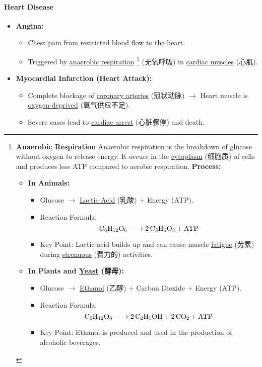 \paragraph{Heart Disease}
\begin{itemize}
    \item \textbf{Angina:}
    \begin{itemize}
        \item Chest pain from restricted blood flow to the heart.
        \item Triggered by \underline{anaerobic respiration} \footnote{\textbf{Anaerobic Respiration} Anaerobic respiration is the
        breakdown of glucose without oxygen to release energy. It occurs in the \underline{cytoplasm} (细胞质) of cells and
        produces less ATP compared to aerobic respiration.
        \textbf{Process:}
        \begin{itemize}
            \item \textbf{In Animals:}
            \begin{itemize}
                \item Glucose $\rightarrow$ \underline{Lactic Acid} (乳酸) + Energy (ATP).
                \item Reaction Formula:
                \begin{equation}
                    \ce{C6H12O6 -> 2C3H6O3 + ATP}
                \end{equation}
                \item Key Point: Lactic acid builds up and can cause muscle \underline{fatigue} (劳累) during
                \underline{strenuous} (费力的) activities.
            \end{itemize}
            \item \textbf{In Plants and \underline{Yeast} (酵母):}
            \begin{itemize}
                \item Glucose $\rightarrow$ \underline{Ethanol} (乙醇) + Carbon Dioxide + Energy (ATP).
                \item Reaction Formula:
                \begin{equation}
                    \ce{C6H12O6 -> 2C2H5OH + 2CO2 + ATP}
                \end{equation}
                \item Key Point: Ethanol is produced and used in the production of alcoholic beverages.
            \end{itemize}
        \end{itemize}} (无氧呼吸) in \underline{cardiac muscles} (心肌).
    \end{itemize}
    \item \textbf{Myocardial Infarction (Heart Attack):}
    \begin{itemize}
        \item Complete blockage of \underline{coronary arteries} (冠状动脉) $\rightarrow$ Heart muscle is
        \underline{oxygen-deprived} (氧气供应不足).
        \item Severe cases lead to \underline{cardiac arrest} (心脏骤停) and death.
    \end{itemize}
\end{itemize}

